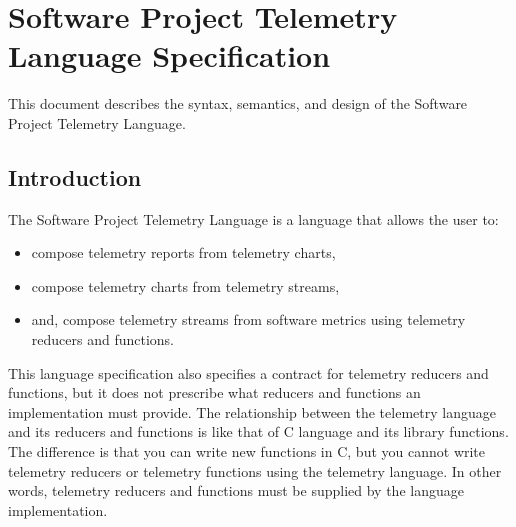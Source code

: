\chapter{Software Project Telemetry Language Specification}  
\label{Chapter:TelemetryLanguageSpecification}



This document describes the syntax, semantics, and design of the Software Project Telemetry Language.
 
\section{Introduction}  \label{TelemetryLanguageSpecification:Introduction}

The Software Project Telemetry Language is a language that allows the user to:
\begin{itemize}
  \setlength{\itemsep}{0pt}
  \setlength{\parskip}{0pt}
  \item compose telemetry reports from telemetry charts,
  \item compose telemetry charts from telemetry streams,
	\item and, compose telemetry streams from software metrics using telemetry reducers and functions.
\end{itemize}

This language specification also specifies a contract for telemetry reducers and functions, but it does not prescribe what reducers and functions an implementation must provide. The relationship between the telemetry language and its reducers and functions is like that of C language and its library functions. The difference is that you can write new functions in C, but you cannot write telemetry reducers or telemetry functions using the telemetry language. In other words, telemetry reducers and functions must be supplied by the language implementation.




